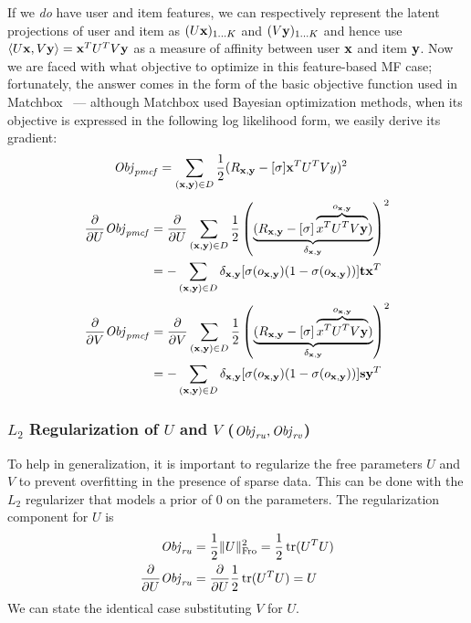 If we \emph{do} have user and item features, we can respectively
represent the latent projections of user and item as $(U \mathbf{x})_{1 \ldots
K}$ and $(V \mathbf{y})_{1 \ldots K}$ and hence use $\langle U \mathbf{x}, V \mathbf{y} \rangle = \mathbf{x}^T
U^T V \mathbf{y}$ as a measure of affinity between user $\mathbf{x}$ and item $\mathbf{y}$.
Now we are faced with what objective to optimize in this feature-based
MF case; fortunately, the answer comes in the form of the basic
objective function used in Matchbox~\cite{matchbox} --- although
Matchbox used Bayesian optimization methods, when its objective is
expressed in the following log likelihood form, we easily derive its
gradient:
\begin{align}
\mathit{Obj}_{\mathit{pmcf}} & = \sum_{(\mathbf{x},\mathbf{y}) \in D} \frac{1}{2} (R_{\mathbf{x},\mathbf{y}} - [\sigma] \mathbf{x}^T U^T V y)^2
\end{align}
\begin{align}
\frac{\partial}{\partial U} \mathit{Obj}_{\mathit{pmcf}} & = \frac{\partial}{\partial U} \sum_{(\mathbf{x},\mathbf{y}) \in D} \frac{1}{2} \left( \underbrace{(R_{\mathbf{x},\mathbf{y}} - [\sigma] \overbrace{x^T U^T V\mathbf{y}}^{o_{\mathbf{x},\mathbf{y}}})}_{\delta_{\mathbf{x},\mathbf{y}}} \right)^2 \nonumber \\
& = - \sum_{(\mathbf{x},\mathbf{y}) \in D} \delta_{\mathbf{x},\mathbf{y}} [\sigma(o_{\mathbf{x},\mathbf{y}}) (1 - \sigma(o_{\mathbf{x},\mathbf{y}}))] \mathbf{t} \mathbf{x}^T \nonumber 
\end{align}
\begin{align}
\frac{\partial}{\partial V} \mathit{Obj}_{\mathit{pmcf}} & = \frac{\partial}{\partial V} \sum_{(\mathbf{x},\mathbf{y}) \in D} \frac{1}{2} \left( \underbrace{(R_{\mathbf{x},\mathbf{y}} - [\sigma] \overbrace{x^T U^T V\mathbf{y}}^{o_{\mathbf{x},\mathbf{y}}})}_{\delta_{\mathbf{x},\mathbf{y}}} \right)^2 \nonumber \\
& = - \sum_{(\mathbf{x},\mathbf{y}) \in D} \delta_{\mathbf{x},\mathbf{y}} [\sigma(o_{\mathbf{x},\mathbf{y}}) (1 - \sigma(o_{\mathbf{x},\mathbf{y}}))] \mathbf{s} \mathbf{y}^T \nonumber 
\end{align}

\subsubsection{$L_2$ Regularization of $U$ and $V$ ($\mathit{Obj}_{\mathit{ru}}, \mathit{Obj}_{\mathit{rv}}$)}

To help in generalization, it is important to regularize the free
parameters $U$ and $V$ to prevent overfitting in the presence of
sparse data. This can be done with the $L_2$ regularizer that models a
prior of $0$ on the parameters. The regularization component for $U$
is
\begin{align}
\mathit{Obj}_{\mathit{ru}} & = \frac{1}{2} \| U \|_{\mathrm{Fro}}^2 = \frac{1}{2} \operatorname{tr}(U^T U)\\
\frac{\partial}{\partial U} \mathit{Obj}_{\mathit{ru}} & = \frac{\partial}{\partial U} \frac{1}{2} \operatorname{tr}(U^T U) = U \nonumber
\end{align}
We can state the identical case substituting $V$ for $U$.

